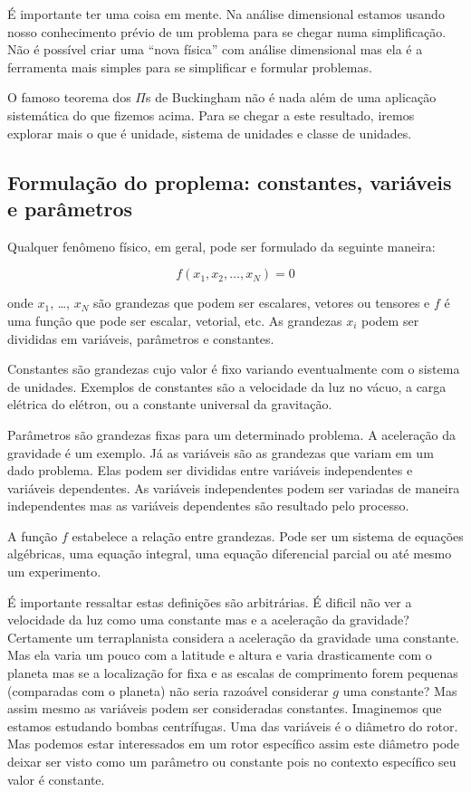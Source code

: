 É importante ter uma coisa em mente. Na análise dimensional estamos usando nosso conhecimento prévio de um problema para se chegar numa simplificação. Não é possível criar uma ``nova física'' com análise dimensional mas ela é a ferramenta mais simples para se simplificar e formular problemas.

O famoso teorema dos $\Pi$s de Buckingham não é nada além de uma aplicação sistemática do que fizemos acima. Para se chegar a este resultado, iremos explorar mais o que é unidade, sistema de unidades e classe de unidades.

\subsection{Formulação do proplema: constantes, variáveis e parâmetros}

Qualquer fenômeno físico, em geral,  pode ser formulado da seguinte maneira:

\[
f\left(x_1, x_2, \ldots, x_N\right) = 0
\]

onde $x_1$, \ldots, $x_N$ são grandezas que podem ser escalares, vetores ou tensores e $f$ é uma função que pode ser escalar, vetorial, etc. As grandezas $x_i$ podem ser divididas em variáveis, parâmetros e constantes.

Constantes são grandezas cujo valor é fixo variando eventualmente com o sistema de unidades. Exemplos de constantes são a velocidade da luz no vácuo, a carga elétrica do elétron, ou a constante universal da gravitação.

Parâmetros são grandezas fixas para um determinado problema. A aceleração da gravidade é um exemplo. Já as variáveis são as grandezas que variam em um dado problema. Elas podem ser divididas entre variáveis independentes e variáveis dependentes. As variáveis independentes podem ser variadas de maneira independentes mas as variáveis dependentes são resultado pelo processo.

A função $f$ estabelece a relação entre grandezas. Pode ser um sistema de equações algébricas, uma equação integral, uma equação diferencial parcial ou até mesmo um experimento.

É importante ressaltar estas definições são arbitrárias. É dificil não ver a velocidade da luz como uma constante mas e a aceleração da gravidade? Certamente um terraplanista considera a aceleração da gravidade uma constante. Mas ela varia um pouco com a latitude e altura e varia drasticamente com o planeta mas se a localização for fixa e as escalas de comprimento forem pequenas (comparadas com o planeta) não seria razoável considerar $g$ uma constante? Mas assim mesmo as variáveis podem ser consideradas constantes. Imaginemos que estamos estudando bombas centrífugas. Uma das variáveis é o diâmetro do rotor. Mas podemos estar interessados em um rotor específico assim este diâmetro pode deixar ser visto como um parâmetro ou constante pois no contexto específico seu valor é constante.

